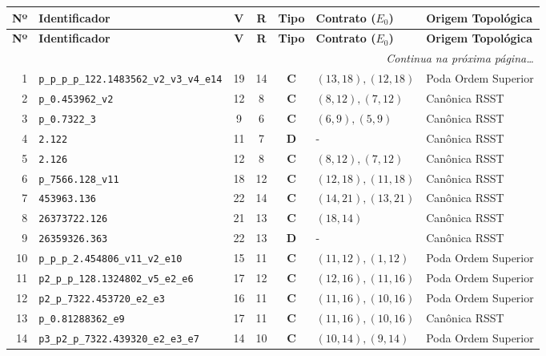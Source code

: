 \documentclass[10pt,a4paper]{article}
\begin{document}
\begin{small}
\begin{longtable}{r l c c c l l}
\toprule
\textbf{Nº} & \textbf{Identificador} & \textbf{V} & \textbf{R} & \textbf{Tipo} & \textbf{Contrato ($E_0$)} & \textbf{Origem Topológica} \\
\midrule
\endfirsthead
\toprule
\textbf{Nº} & \textbf{Identificador} & \textbf{V} & \textbf{R} & \textbf{Tipo} & \textbf{Contrato ($E_0$)} & \textbf{Origem Topológica} \\
\midrule
\endhead
\midrule
\multicolumn{7}{r}{\textit{Continua na próxima página\dots}} \\
\bottomrule
\endfoot
\bottomrule
\endlastfoot

1 & \texttt{p\_p\_p\_p\_122.1483562\_v2\_v3\_v4\_e14} & 19 & 14 & \textbf{C} & $(13,18), (12,18)$ & Poda Ordem Superior \\
2 & \texttt{p\_0.453962\_v2} & 12 & 8 & \textbf{C} & $(8,12), (7,12)$ & Canônica RSST \\
3 & \texttt{p\_0.7322\_3} & 9 & 6 & \textbf{C} & $(6,9), (5,9)$ & Canônica RSST \\
4 & \texttt{2.122} & 11 & 7 & \textbf{D} & - & Canônica RSST \\
5 & \texttt{2.126} & 12 & 8 & \textbf{C} & $(8,12), (7,12)$ & Canônica RSST \\
6 & \texttt{p\_7566.128\_v11} & 18 & 12 & \textbf{C} & $(12,18), (11,18)$ & Canônica RSST \\
7 & \texttt{453963.136} & 22 & 14 & \textbf{C} & $(14,21), (13,21)$ & Canônica RSST \\
8 & \texttt{26373722.126} & 21 & 13 & \textbf{C} & $(18,14)$ & Canônica RSST \\
9 & \texttt{26359326.363} & 22 & 13 & \textbf{D} & - & Canônica RSST \\
10 & \texttt{p\_p\_p\_2.454806\_v11\_v2\_e10} & 15 & 11 & \textbf{C} & $(11,12), (1,12)$ & Poda Ordem Superior \\
11 & \texttt{p2\_p\_p\_128.1324802\_v5\_e2\_e6} & 17 & 12 & \textbf{C} & $(12,16), (11,16)$ & Poda Ordem Superior \\
12 & \texttt{p2\_p\_7322.453720\_e2\_e3} & 16 & 11 & \textbf{C} & $(11,16), (10,16)$ & Poda Ordem Superior \\
13 & \texttt{p\_0.81288362\_e9} & 17 & 11 & \textbf{C} & $(11,16), (10,16)$ & Canônica RSST \\
14 & \texttt{p3\_p2\_p\_7322.439320\_e2\_e3\_e7} & 14 & 10 & \textbf{C} & $(10,14), (9,14)$ & Poda Ordem Superior \\

\end{longtable}
\end{small}
\end{document}
